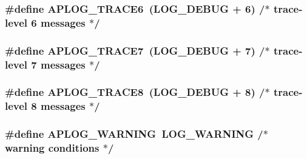 \subsubsection[{\texorpdfstring{A\+P\+L\+O\+G\+\_\+\+T\+R\+A\+C\+E6}{APLOG_TRACE6}}]{\setlength{\rightskip}{0pt plus 5cm}\#define A\+P\+L\+O\+G\+\_\+\+T\+R\+A\+C\+E6~(L\+O\+G\+\_\+\+D\+E\+B\+UG + 6)  /$\ast$ trace-\/{\bf level} 6 messages $\ast$/}\hypertarget{group__APACHE__CORE__LOG_gad067edc2e8853edaa2a1b54792b62f87}{}\label{group__APACHE__CORE__LOG_gad067edc2e8853edaa2a1b54792b62f87}
\subsubsection[{\texorpdfstring{A\+P\+L\+O\+G\+\_\+\+T\+R\+A\+C\+E7}{APLOG_TRACE7}}]{\setlength{\rightskip}{0pt plus 5cm}\#define A\+P\+L\+O\+G\+\_\+\+T\+R\+A\+C\+E7~(L\+O\+G\+\_\+\+D\+E\+B\+UG + 7)  /$\ast$ trace-\/{\bf level} 7 messages $\ast$/}\hypertarget{group__APACHE__CORE__LOG_ga90c9ee0877e812054113ea3c9385a231}{}\label{group__APACHE__CORE__LOG_ga90c9ee0877e812054113ea3c9385a231}
\subsubsection[{\texorpdfstring{A\+P\+L\+O\+G\+\_\+\+T\+R\+A\+C\+E8}{APLOG_TRACE8}}]{\setlength{\rightskip}{0pt plus 5cm}\#define A\+P\+L\+O\+G\+\_\+\+T\+R\+A\+C\+E8~(L\+O\+G\+\_\+\+D\+E\+B\+UG + 8)  /$\ast$ trace-\/{\bf level} 8 messages $\ast$/}\hypertarget{group__APACHE__CORE__LOG_ga08fc65b391ff4c007f69cd46f4423ac3}{}\label{group__APACHE__CORE__LOG_ga08fc65b391ff4c007f69cd46f4423ac3}
\subsubsection[{\texorpdfstring{A\+P\+L\+O\+G\+\_\+\+W\+A\+R\+N\+I\+NG}{APLOG_WARNING}}]{\setlength{\rightskip}{0pt plus 5cm}\#define A\+P\+L\+O\+G\+\_\+\+W\+A\+R\+N\+I\+NG~L\+O\+G\+\_\+\+W\+A\+R\+N\+I\+NG     /$\ast$ warning conditions $\ast$/}\hypertarget{group__APACHE__CORE__LOG_ga73e14aeff380a8a01c66d528162026fe}{}\label{group__APACHE__CORE__LOG_ga73e14aeff380a8a01c66d528162026fe}
